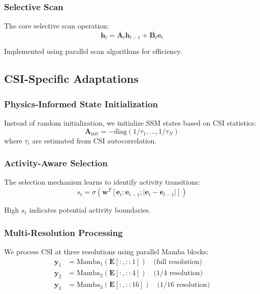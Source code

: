 \documentclass[10pt,conference]{IEEEtran}
\begin{document}
\subsubsection{Selective Scan}
The core selective scan operation:
\begin{equation}
    \mathbf{h}_t = \overline{\mathbf{A}}_t \mathbf{h}_{t-1} + \overline{\mathbf{B}}_t \mathbf{e}_t
\end{equation}

Implemented using parallel scan algorithms for efficiency.

\subsection{CSI-Specific Adaptations}

\subsubsection{Physics-Informed State Initialization}
Instead of random initialization, we initialize SSM states based on CSI statistics:
\begin{equation}
    \mathbf{A}_{\text{init}} = -\text{diag}(1/\tau_1, ..., 1/\tau_N)
\end{equation}
where $\tau_i$ are estimated from CSI autocorrelation.

\subsubsection{Activity-Aware Selection}
The selection mechanism learns to identify activity transitions:
\begin{equation}
    s_t = \sigma(\mathbf{w}^T[\mathbf{e}_t; \mathbf{e}_{t-1}; |\mathbf{e}_t - \mathbf{e}_{t-1}|])
\end{equation}

High $s_t$ indicates potential activity boundaries.

\subsubsection{Multi-Resolution Processing}
We process CSI at three resolutions using parallel Mamba blocks:
\begin{align}
    \mathbf{y}_1 &= \text{Mamba}_1(\mathbf{E}[:, ::1]) \quad \text{(full resolution)} \\
    \mathbf{y}_2 &= \text{Mamba}_2(\mathbf{E}[:, ::4]) \quad \text{(1/4 resolution)} \\
    \mathbf{y}_3 &= \text{Mamba}_3(\mathbf{E}[:, ::16]) \quad \text{(1/16 resolution)}
\end{align}
\end{document}
